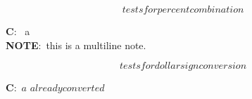 \documentclass{article}
\begin{document}
\begin{equation}
  tests for percent combination
\end{equation}
\begin{flushright}
   {\bf C}:~   a \\[0.2cm]
   {\bf NOTE}:~this   is a   multiline note.
\end{flushright}

\begin{equation}
  tests for dollarsign conversion
\end{equation}
\begin{flushright}
   {\bf C}:~${\displaystyle a}$ ${\displaystyle alreadyconverted}$
\end{flushright}
\end{document}

